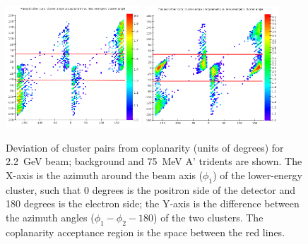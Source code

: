 \begin{figure}[ht]
	\includegraphics[width=0.45\textwidth]{performance/trigger/coplanarity_22}
	\includegraphics[width=0.45\textwidth]{performance/trigger/coplanarity_22_075mev}
	\caption{\small{Deviation of cluster pairs from coplanarity (units of degrees) for 2.2~GeV beam; background and 75~MeV A' tridents are shown. The X-axis is the azimuth around the beam axis ($\phi_1$) of the lower-energy cluster, such that 0 degrees is the positron side of the detector and 180 degrees is the electron side; the Y-axis is the difference between the azimuth angles ($\phi_1-\phi_2 - 180$) of the two clusters. The coplanarity acceptance region is the space between the red lines.}}
	\label{fig:coplanarity}
\end{figure}

